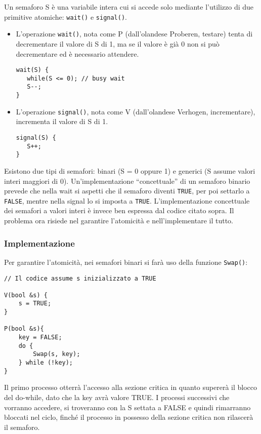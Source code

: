 \documentclass[a4]{article}
\begin{document}
Un semaforo S è una variabile intera cui si accede solo mediante l'utilizzo di due primitive atomiche: \texttt{wait()} e \texttt{signal()}.
\begin{itemize}
    \item L'operazione \texttt{wait()}, nota come P (dall'olandese Proberen, testare) tenta di decrementare il valore di S di 1, ma se il valore è già 0 non si può decrementare ed è necessario attendere.
          \begin{verbatim}
wait(S) {
   while(S <= 0); // busy wait
   S--;
}
\end{verbatim}
    \item L'operazione \texttt{signal()}, nota come V (dall'olandese Verhogen, incrementare), incrementa il valore di S di 1.
          \begin{verbatim}
signal(S) {
   S++;
}
\end{verbatim}
\end{itemize}

Esistono due tipi di semafori: binari (S = 0 oppure 1) e generici (S assume valori interi maggiori di 0). Un'implementazione ``concettuale'' di un semaforo binario prevede che nella wait si aspetti che il semaforo diventi \texttt{TRUE}, per poi settarlo a \texttt{FALSE}, mentre nella signal lo si imposta a \texttt{TRUE}. L'implementazione concettuale dei semafori a valori interi è invece ben espressa dal codice citato sopra. \newline
Il problema ora risiede nel garantire l'atomicità e nell'implementare il tutto.

\subsubsection{Implementazione}
Per garantire l'atomicità, nei semafori binari si farà uso della funzione \texttt{Swap()}:
\begin{verbatim}
// Il codice assume s inizializzato a TRUE

V(bool &s) {
    s = TRUE;
} 

P(bool &s){                                            
    key = FALSE;
    do {                                                       
        Swap(s, key);
    } while (!key);
}
\end{verbatim}
Il primo processo otterrà l'accesso alla sezione critica in quanto supererà il blocco del do-while, dato che la key avrà valore TRUE. I processi successivi che vorranno accedere, si troveranno con la S settata a FALSE e quindi rimarranno bloccati nel ciclo, finché il processo in possesso della sezione critica non rilascerà il semaforo.
\end{document}
